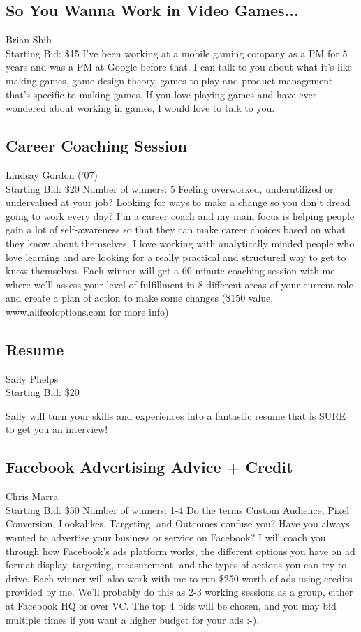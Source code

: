\documentclass[11pt]{article}
\begin{document}
\subsection{So You Wanna Work in Video Games...}
Brian Shih
\\
Starting Bid: \$15
\newline
I’ve been working at a mobile gaming company as a PM for 5 years and was a PM at Google before that. I can talk to you about what it’s like making games, game design theory, games to play and product management that’s specific to making games. If you love playing games and have ever wondered about working in games, I would love to talk to you.
\subsection{Career Coaching Session}
Lindsay Gordon ('07)
\\
Starting Bid: \$20
\newline
Number of winners: 5
\newline
Feeling overworked, underutilized or undervalued at your job? Looking for ways to make a change so you don't dread going to work every day? I'm a career coach and my main focus is helping people gain a lot of self-awareness so that they can make career choices based on what they know about themselves. I love working with analytically minded people who love learning and are looking for a really practical and structured way to get to know themselves. Each winner will get a 60 minute coaching session with me where we'll assess your level of fulfillment in 8 different areas of your current role and create a plan of action to make some changes (\$150 value, www.alifeofoptions.com for more info)
\subsection{Resume}
Sally Phelps
\\
Starting Bid: \$20
\newline

Sally will turn your skills and experiences into a fantastic resume that is SURE to get you an interview!
\subsection{Facebook Advertising Advice + Credit}
Chris Marra
\\
Starting Bid: \$50
\newline
Number of winners: 1-4
\newline
Do the terms Custom Audience, Pixel Conversion, Lookalikes, Targeting, and Outcomes confuse you? Have you always wanted to advertise your business or service on Facebook? I will coach you through how Facebook's ads platform works, the different options you have on ad format display, targeting, measurement, and the types of actions you can try to drive. Each winner will also work with me to run \$250 worth of ads using credits provided by me. We'll probably do this as 2-3 working sessions as a group, either at Facebook HQ or over VC. The top 4 bids will be chosen, and you may bid multiple times if you want a higher budget for your ads :-).
\end{document}
